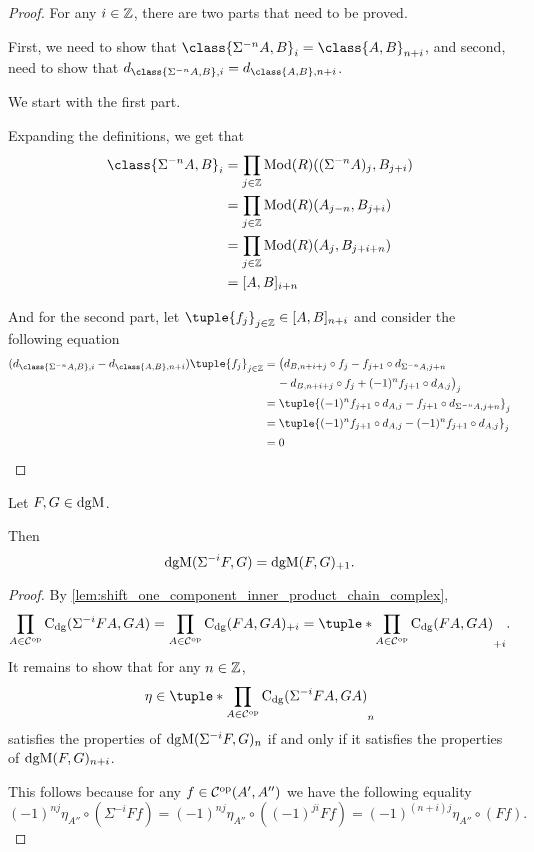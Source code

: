 \begin{proof}
    For any \( i \in {\mathbb{Z}} \), there are two parts that need to be proved.

    First, we need to show that \( \class{\Sigma^{-n} A, B}_i = \class{A, B}_{n + i} \), and second, need to show that \( d_{\class{\Sigma^{-n} A, B}, i} = d_{\class{A, B}, n + i} \).

    We start with the first part.

    Expanding the definitions, we get that
    \begin{align*}
        \class{\Sigma^{-n} A, B}_i &= \prod_{j \in \Zb} \Mod(R)((\Sigma^{-n} A)_j, B_{j + i}) \\
        &= \prod_{j \in \Zb} \Mod(R)(A_{j - n}, B_{j + i}) \\
        &= \prod_{j \in \Zb} \Mod(R)(A_j, B_{j + i + n}) \\
        &= [A, B]_{i + n}
    \end{align*}

    And for the second part, let \( \tuple{f_j}_{j \in \Zb} \in [A, B]_{n + i} \) and consider the following equation
    \begin{align*}
        (d_{\class{\Sigma^{-n} A, B}, i} - d_{\class{A, B}, n + i})\tuple{f_j}_{j \in \Zb} &= \big(d_{B, n + i + j} \circ f_j - f_{j + 1} \circ d_{\Sigma^{-n} A, j + n} \\
        &\hspace{0.4cm} - d_{B, n + i + j} \circ f_j + (-1)^n f_{j + 1} \circ d_{A, j}\big)_j \\
        &= \tuple{(-1)^n f_{j + 1} \circ d_{A, j} - f_{j + 1} \circ d_{\Sigma^{-n} A, j + n}}_j \\
        &= \tuple{(-1)^n f_{j + 1} \circ d_{A, j} - (-1)^n f_{j + 1} \circ d_{A, j}}_j \\
        &= 0 \qedhere
    \end{align*}
\end{proof}

\begin{lemma}
    \label{lem:dgmod_shift_eq_plus}
    Let \( F, G \in \operatorname{dgM} \).

    Then
    \[
        \operatorname{dgM}(\Sigma^{-i} F, G) = \operatorname{dgM}(F, G)_{+1}.
    \]
\end{lemma}
\begin{proof}
    By \autoref{lem:shift_one_component_inner_product_chain_complex},
    \[
        \prod_{A \in \Cc^{\op}} \C_{\dg}(\Sigma^{-i} F A, G A) = \prod_{A \in \Cc^{\op}} \C_{\dg}(F A, G A)_{+i} = \tuple*{\prod_{A \in \Cc^{\op}} \C_{\dg}(F A, G A)}_{+i}.
    \]
    It remains to show that for any \( n \in {\mathbb{Z}} \),
    \[
        \eta \in \tuple*{\prod_{A \in \Cc^{\op}} \C_{\dg}(\Sigma^{-i} F A, G A)}_n
    \]
    satisfies the properties of \( \operatorname{dgM}(\Sigma^{-i} F, G)_n \) if and only if it satisfies the properties of \( \operatorname{dgM}(F, G)_{n + i} \).

    This follows because for any \( f \in {\mathcal{C}}^{\operatorname{op}}(A', A'') \) we have the following equality
    \[
        (-1)^{nj} \eta_{A''} \circ (\Sigma^{-i} F f) = (-1)^{nj} \eta_{A''} \circ ((-1)^{ji}F f) = (-1)^{(n + i)j}\eta_{A''} \circ (F f).
    \]
\end{proof}

